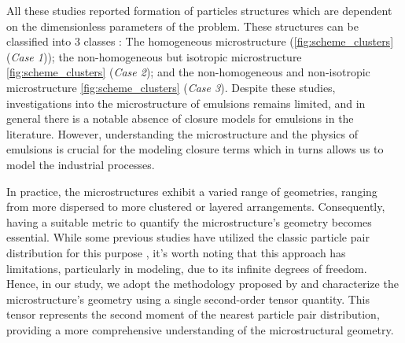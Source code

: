 All these studies reported formation of particles structures which are dependent on the dimensionless parameters of the problem. 
These structures can be classified into $3$ classes : The homogeneous microstructure (\ref{fig:scheme_clusters} (\textit{Case 1})); the non-homogeneous but isotropic microstructure \ref{fig:scheme_clusters} (\textit{Case 2}); and the non-homogeneous and non-isotropic microstructure \ref{fig:scheme_clusters} (\textit{Case 3}). 
Despite these studies, investigations into the microstructure of emulsions remains limited, and in general there is a notable absence of closure models for emulsions in the literature.  
However, understanding the microstructure and the physics of emulsions is crucial for the modeling closure terms which in turns allows us to model the industrial processes. 

In practice, the microstructures exhibit a varied range of geometries, ranging from more dispersed to more clustered or layered arrangements. Consequently, having a suitable metric to quantify the microstructure's geometry becomes essential. While some previous studies have utilized the classic particle pair distribution for this purpose \citep{yin2007,seyed2021sedimentation}, it's worth noting that this approach has limitations, particularly in modeling, due to its infinite degrees of freedom. Hence, in our study, we adopt the methodology proposed by \citet{zhang2023evolution} and characterize the microstructure's geometry using a single second-order tensor quantity. This tensor represents the second moment of the nearest particle pair distribution, providing a more comprehensive understanding of the microstructural geometry.

